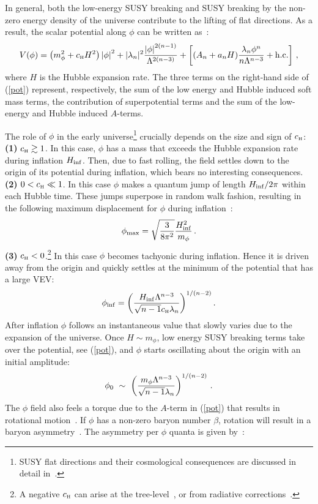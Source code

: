 \documentclass[11pt,a4paper]{article}
\newcommand{\be}{\begin{equation}}
\newcommand{\ee}{\end{equation}}
\def\H{{\scriptscriptstyle \rm H}}
\newcommand{\gsim}{\gtrsim}
\begin{document}
In general, both the low-energy SUSY breaking and SUSY breaking by the non-zero energy density of the universe contribute to the lifting of flat directions. As a result, the scalar potential along $\phi$ can be written as~\cite{Dine95}:
\be
V(\phi) = \left(m^2_\phi + c_\H H^2 \right) {\vert \phi \vert}^2 +
\vert \lambda_n \vert^2 {{\vert \phi \vert}^{2(n-1)} \over \Lambda^{2(n-3)}} + \left[(A_n + a_n H) {\lambda_n \phi^n \over n \Lambda^{n-3}} + {\rm h.c.} \right]\, ,
\label{pot}
\ee
where $H$ is the Hubble expansion rate. The three terms on the right-hand side of (\ref{pot}) represent, respectively, the sum of the low energy and Hubble induced soft mass terms, the contribution of superpotential terms and the sum of the low-energy and Hubble induced $A$-terms. 

The role of $\phi$ in the early universe\footnote{SUSY flat directions and their cosmological consequences are discussed in detail  in~\cite{flat}.} crucially depends on the size and sign of $c_\H$: 
\vskip 2mm
\noindent
{\bf (1)} $c_\H \gsim 1$. In this case, $\phi$ has a mass that exceeds the Hubble expansion rate during inflation $H_{\rm inf}$. Then, due to fast rolling,
the field settles down to the origin of its potential during inflation, which bears no interesting consequences. 
\vskip 2mm
\noindent
{\bf (2)} $0 < c_\H \ll 1$. In this case $\phi$ makes a quantum jump of length $H_{\rm inf}/2\pi$ within
each Hubble time. These jumps superpose in random walk fashion, resulting in the following maximum displacement for $\phi$ during inflation~\cite{Linde}:
\be 
\phi_{\rm max} = \sqrt{\frac{3}{8 \pi^2}} \frac{H^2_{\rm inf}}{m_\phi}\,.
\label{rms}
\ee
\vskip 2mm
\noindent
{\bf (3)} $c_\H < 0$.\footnote{A negative $c_\H$ can arise at the tree-level~\cite{Dine95}, or from radiative corrections~\cite{gmo,adm}.} In this case $\phi$ becomes tachyonic during inflation. Hence it is driven away from the origin and quickly settles at the minimum of the potential that has a large VEV: 
\be \label{tach}
\phi_{\rm inf} = \left({H_{\rm inf} \Lambda^{n-3} \over \sqrt{n-1} c_\H \lambda_n} \right)^{1/(n-2)}.
\ee
After inflation $\phi$ follows an instantaneous value that slowly varies due to the expansion of the universe. Once $H \sim m_\phi$, low energy SUSY breaking terms take over the potential, see (\ref{pot}), and $\phi$ starts oscillating about the origin with an initial amplitude:
\be \label{initial}
\phi_0 ~ \sim ~ \left({m_\phi \Lambda^{n-3} \over \sqrt{n-1} \lambda_n}\right)^{1/(n-2)}\, .
\ee
The $\phi$ field also feels a torque due to the $A$-term in (\ref{pot}) that results in rotational motion~\cite{Dine95}. If $\phi$ has a non-zero baryon number $\beta$, rotation will result in a baryon asymmetry~\cite{Affleck:1984fy}. The asymmetry per $\phi$ quanta is given by~\cite{Dine95}:
\end{document}
